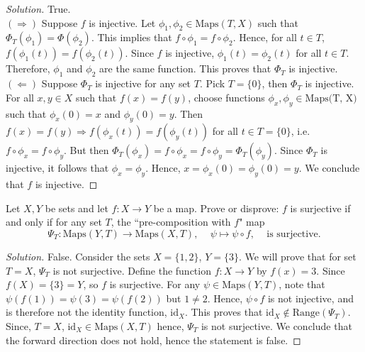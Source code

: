 \documentclass[12pt]{article}
\newenvironment{problem}[2][Problem]{\begin{trivlist}
\item[\hskip \labelsep {\bfseries #1}\hskip \labelsep {\bfseries #2.}]}{\end{trivlist}}
\begin{document}
\begin{proof}[Solution]
True.
\\

$(\Rightarrow)$ Suppose $f$ is injective. Let $\phi_1,\phi_2 \in \text{Maps}(T, X)$ such that $\Phi_T(\phi_1) = \Phi(\phi_2)$. This implies that $f \circ \phi_1 = f \circ \phi_2$. Hence, for all $t \in T$, $f(\phi_1(t)) = f(\phi_2(t))$. Since  $f$ is injective, $\phi_1(t) = \phi_2(t)$ for all $t \in T$. Therefore, $\phi_1$ and $\phi_2$ are the same function. This proves that $\Phi_T$ is injective.
\\

$(\Leftarrow)$ Suppose $\Phi_T$ is injective for any set $T$. Pick $T = \{0\}$, then $\Phi_T$ is injective. For all $x, y \in X$ such that $f(x) = f(y)$, choose functions $\phi_x, \phi_y \in \text{Maps(T, X)}$ such that $\phi_x(0) = x$ and $\phi_y(0) = y$. Then $f(x) = f(y) \Rightarrow f(\phi_x(t)) = f(\phi_y(t))$ for all $t \in T = \{0\}$, i.e. $f \circ \phi_x = f \circ \phi_y$. But then $\Phi_T(\phi_x) = f \circ \phi_x = f \circ \phi_y = \Phi_T(\phi_y)$. Since $\Phi_T$ is injective, it follows that $\phi_x = \phi_y$. Hence, $x = \phi_x(0) = \phi_y(0) = y$. We conclude that $f$ is injective.
\end{proof}

\newpage

\begin{problem}{5}[10 points]
Let $X, Y$ be sets and let $f : X \rightarrow Y$ be a map. Prove or disprove: $f$ is surjective if and only if for any set $T$, the ``pre-composition with $f$" map
\[\Psi_T : \text{Maps}(Y, T) \longrightarrow \text{Maps}(X, T) \text{, } \quad \psi \longmapsto \psi \circ f \text{, } \quad \text{is surjective.}\]
\end{problem}

\begin{proof}[Solution]
False. Consider the sets $X = \{1, 2\}$, $Y = \{3\}$. We will prove that for set $T = X$, $\Psi_T$ is not surjective. Define the function $f : X \to Y$ by $f(x) = 3$. Since $f(X) = \{3\} = Y$, so $f$ is surjective. For any $\psi \in \text{Maps}(Y, T)$, note that $\psi(f(1)) = \psi(3) = \psi(f(2))$ but $1 \neq 2$. Hence, $\psi \circ f$ is not injective, and is therefore not the identity function, $\text{id}_X$. This proves that $\text{id}_X \notin \text{Range}(\Psi_T)$. Since, $T = X$, $\text{id}_X \in \text{Maps}(X, T)$ hence, $\Psi_T$ is not surjective. We conclude that the forward direction does not hold, hence the statement is false.
\end{proof}
\end{document}
